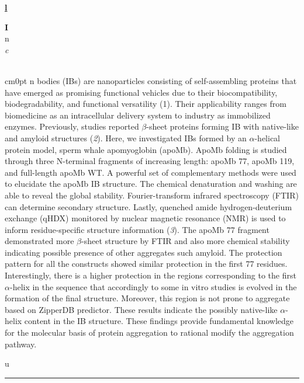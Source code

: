 \documentclass[titlepage,oneside,openany,10pt]{book}
\newenvironment{oralabswrefwfig}[8] %
        {
        \newcommand{\oralref}{#5}
	\FPeval{\cutw}{clip(16.7-#7)}
	\FPeval{\cutl}{round(#8/0.35,3)}
        \begin{flushright}
                \underline{\textbf{#4}}
        \end{flushright}
        \textbf{#1}\\%
        #2\\%
        \textit{#3}\\\\%
        \def\windowpagestuff{\centering
                \texttt{[image: \#6]}}
        \opencutright
        \begin{cutout}{0}{\cutw cm}{0pt}{\RoundingUpFunction{\cutl}}
        \noindent
        }
        {
        \end{cutout}
        \vspace{0.5cm}
        \noindent \oralref \\ \noindent\rule{15cm}{0.5pt}%
        }
\begin{document}
\begin{oralabswrefwfig}
    Inclusion bodies (IBs) are nanoparticles consisting of self-assembling proteins that have emerged as promising functional vehicles due to their biocompatibility, biodegradability, and functional versatility (1). Their applicability ranges from biomedicine as an intracellular delivery system to industry as immobilized enzymes. Previously, studies reported $\beta$-sheet proteins forming IB with native-like and amyloid structures (\emph{2}). Here, we investigated IBs formed by an $\alpha$-helical protein model, sperm whale apomyoglobin (apoMb). ApoMb folding is studied through three N-terminal fragments of increasing length: apoMb 77, apoMb 119, and full-length apoMb WT. A powerful set of complementary methods were used to elucidate the apoMb IB structure. The chemical denaturation and washing are able to reveal the global stability. Fourier-transform infrared spectroscopy (FTIR) can determine secondary structure. Lastly, quenched amide hydrogen-deuterium exchange (qHDX) monitored by nuclear magnetic resonance (NMR) is used to inform residue-specific structure information (\emph{3}). The apoMb 77 fragment demonstrated more $\beta$-sheet structure by FTIR and also more chemical stability indicating possible presence of other aggregates such amyloid. The protection pattern for all the constructs showed similar protection in the first 77 residues. Interestingly, there is a higher protection in the regions corresponding to the first $\alpha$-helix in the sequence that accordingly to some in vitro studies is evolved in the formation of the final structure. Moreover, this region is not prone to aggregate based on ZipperDB predictor. These results indicate the possibly native-like $\alpha$-helix content in the IB structure. These findings provide fundamental knowledge for the molecular basis of protein aggregation to rational modify the aggregation pathway.
    \label{SiebeneichlerB}
\end{oralabswrefwfig}

\newpage
\end{document}
